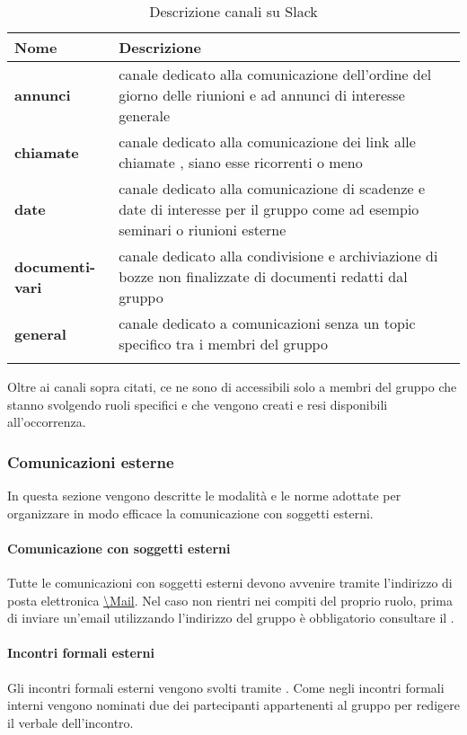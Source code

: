 \setlength{\freewidth}{\dimexpr\textwidth-0\tabcolsep}
	\renewcommand{\arraystretch}{1.5}
	\setlength{\aboverulesep}{0pt}
	\setlength{\belowrulesep}{0pt}
	\begin{longtable}{L{.210\freewidth} L{.6\freewidth} L{.080\freewidth}}
		\toprule 
		\textbf{Nome} & \textbf{Descrizione} \\
		\toprule
		\endhead		
		\textbf{annunci} & canale dedicato alla comunicazione dell'ordine del giorno delle riunioni e ad annunci di interesse generale \\
		\textbf{chiamate} & canale dedicato alla comunicazione dei link alle chiamate , siano esse ricorrenti o meno \\
		 \textbf{date} & canale dedicato alla comunicazione di scadenze e date di interesse per il gruppo come ad esempio seminari o riunioni esterne \\
		\textbf{documenti-vari} & canale dedicato alla condivisione e archiviazione di bozze non finalizzate di documenti redatti dal gruppo \\
		 \textbf{general} & canale dedicato a comunicazioni senza un topic specifico tra i membri del gruppo \\
		\bottomrule
		\hiderowcolors
		\caption{Descrizione canali su Slack}
	\end{longtable}
Oltre ai canali sopra citati, ce ne sono di accessibili solo a membri del gruppo che stanno svolgendo ruoli specifici e che vengono creati e resi disponibili all'occorrenza.
\subsubsection{Comunicazioni esterne}
In questa sezione vengono descritte le modalità e le norme adottate per organizzare in modo efficace la comunicazione con soggetti esterni.
\paragraph*{Comunicazione con soggetti esterni}
Tutte le comunicazioni con soggetti esterni devono avvenire tramite l'indirizzo di posta elettronica \url{\Mail}. Nel caso non rientri nei compiti del proprio ruolo, prima di inviare un'email utilizzando l'indirizzo del gruppo è obbligatorio consultare il \RdP{}.
\paragraph*{Incontri formali esterni}
Gli incontri formali esterni vengono svolti tramite . Come negli incontri formali interni vengono nominati due dei partecipanti appartenenti al gruppo per redigere il verbale dell'incontro. 


